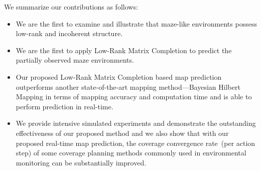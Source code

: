 We summarize our contributions as follows:
\begin{itemize}
    \item 
    We are the first to examine and illustrate that maze-like environments possess low-rank and incoherent structure.
    \item
    We are the first to apply Low-Rank Matrix Completion to predict the partially observed maze environments.
    \item
    Our proposed Low-Rank Matrix Completion based map prediction outperforms another state-of-the-art mapping method---Bayesian Hilbert Mapping in terms of mapping accuracy and computation time and is able to perform prediction in real-time.
    \item
    We provide intensive simulated experiments and demonstrate the outstanding effectiveness of our proposed method and we also show that with our proposed real-time map prediction, the coverage convergence rate~(per action step) of some coverage planning methods commonly used in environmental monitoring can be substantially improved.
\end{itemize}
